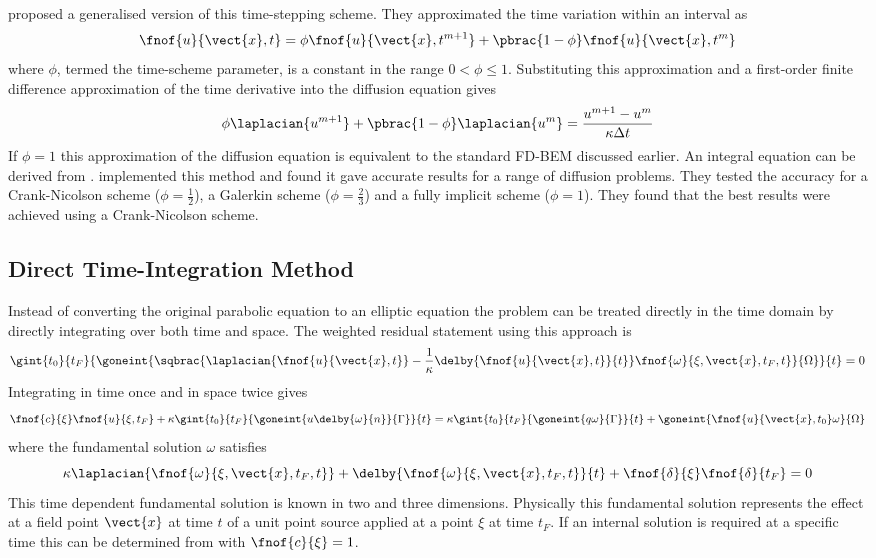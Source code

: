 \citet{tanaka:1994} proposed a generalised version of this time-stepping
scheme.  They approximated the time variation within an interval as
\begin{equation}
\fnof{u}{\vect{x},t} = \phi \fnof{u}{\vect{x},t^{m+1}} + \pbrac{1-\phi}
\fnof{u}{\vect{x},t^{m}}
\end{equation}
where $\phi$, termed the time-scheme parameter, is a constant in the range
$0 < \phi \leq 1$.  Substituting this approximation and a first-order
finite difference approximation of the time derivative into the diffusion
equation gives
\begin{equation}
  \phi \laplacian{u^{m+1}} + \pbrac{1 - \phi} \laplacian{u^{m}} = \dfrac{u^{m+1} -
    u^{m}}{\kappa \Delta t}
\label{eq:tandiffapprox}
\end{equation}
If $\phi = 1$ this approximation of the diffusion equation is
equivalent to the standard FD-BEM discussed earlier.  An integral equation
can be derived from .  
implemented this method and found it gave accurate results for a range of
diffusion problems.  They tested the accuracy for a Crank-Nicolson scheme
($\phi = \frac{1}{2}$), a Galerkin scheme ($\phi = \frac{2}{3}$) and a
fully implicit scheme ($\phi = 1$). They found that the best results were
achieved using a Crank-Nicolson scheme. 

\subsection{Direct Time-Integration Method}

Instead of converting the original parabolic equation to an elliptic
equation the problem can be treated directly in the time domain by directly
integrating over both time and space.  The weighted residual statement
using this approach is
\begin{equation}
  \gint{t_{0}}{t_{F}}{\goneint{\sqbrac{\laplacian{\fnof{u}{\vect{x},t}} -
        \dfrac{1}{\kappa} \delby{\fnof{u}{\vect{x},t}}{t}}
      \fnof{\omega}{\xi,\vect{x},t_{F},t}}{\Omega}}{t} = 0
\end{equation}
Integrating in time once and in space twice gives
\begin{equation}
  \fnof{c}{\xi} \fnof{u}{\xi,t_{F}} + \kappa \gint{t_{0}}{t_{F}}
  {\goneint{u \delby{\omega}{n}}{\Gamma}}{t} = \kappa
  \gint{t_{0}}{t_{F}}{\goneint{q \omega}{\Gamma}}{t} +
  \goneint{\fnof{u}{\vect{x},t_{0}} \omega}{\Omega}
\label{eq:tdfs}
\end{equation}
where the fundamental solution $\omega$ satisfies
\begin{equation}
  \kappa \laplacian{\fnof{\omega}{\xi,\vect{x},t_{F},t}} 
  + \delby{\fnof{\omega}{\xi,\vect{x},t_{F},t}}{t} 
  + \fnof{\delta}{\xi} \fnof{\delta}{t_{F}} = 0
\end{equation}
This time dependent fundamental solution is known in two and three
dimensions.  Physically this fundamental solution represents the effect at
a field point $\vect{x}$ at time $t$ of a unit point source applied at a
point $\xi$ at time $t_{F}$.  If an internal solution is required at a
specific time this can be determined from  with $\fnof{c}{\xi} = 1$.


